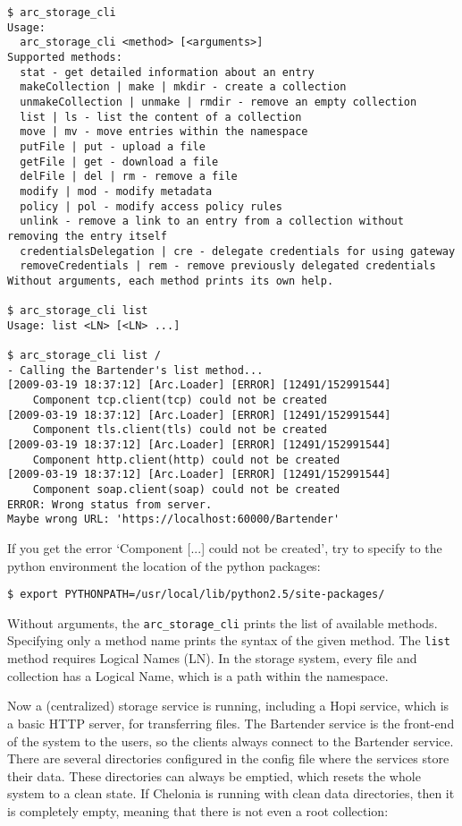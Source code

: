 \documentclass{article}
\begin{document}
\begin{verbatim}
$ arc_storage_cli
Usage:
  arc_storage_cli <method> [<arguments>]
Supported methods:
  stat - get detailed information about an entry
  makeCollection | make | mkdir - create a collection
  unmakeCollection | unmake | rmdir - remove an empty collection
  list | ls - list the content of a collection
  move | mv - move entries within the namespace
  putFile | put - upload a file
  getFile | get - download a file
  delFile | del | rm - remove a file
  modify | mod - modify metadata
  policy | pol - modify access policy rules
  unlink - remove a link to an entry from a collection without removing the entry itself
  credentialsDelegation | cre - delegate credentials for using gateway
  removeCredentials | rem - remove previously delegated credentials
Without arguments, each method prints its own help.

$ arc_storage_cli list
Usage: list <LN> [<LN> ...]

$ arc_storage_cli list /
- Calling the Bartender's list method...
[2009-03-19 18:37:12] [Arc.Loader] [ERROR] [12491/152991544]
    Component tcp.client(tcp) could not be created
[2009-03-19 18:37:12] [Arc.Loader] [ERROR] [12491/152991544]
    Component tls.client(tls) could not be created
[2009-03-19 18:37:12] [Arc.Loader] [ERROR] [12491/152991544]
    Component http.client(http) could not be created
[2009-03-19 18:37:12] [Arc.Loader] [ERROR] [12491/152991544]
    Component soap.client(soap) could not be created
ERROR: Wrong status from server.
Maybe wrong URL: 'https://localhost:60000/Bartender'
\end{verbatim}

If you get the error `Component [...] could not be created', try to specify to the python environment the location of the python packages:

\begin{verbatim}
$ export PYTHONPATH=/usr/local/lib/python2.5/site-packages/
\end{verbatim}

Without arguments, the \verb!arc_storage_cli! prints the list of available methods. Specifying only a method name prints the syntax of the given method. The \verb!list! method requires Logical Names (LN). In the storage system, every file and collection has a Logical Name, which is a path within the namespace.

Now a (centralized) storage service is running, including a Hopi service, which is a basic HTTP server, for transferring files. The Bartender service is the front-end of the system to the users, so the clients always connect to the Bartender service. There are several directories configured in the config file where the services store their data. These directories can always be emptied, which resets the whole system to a clean state. If Chelonia is running with clean data directories, then it is completely empty, meaning that there is not even a root collection:
\end{document}
